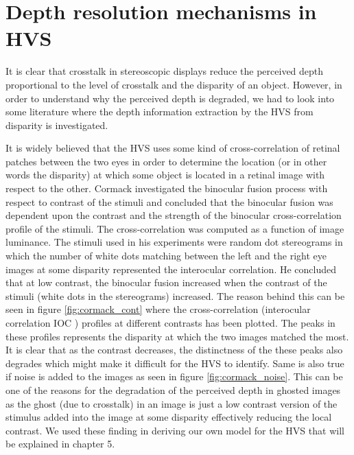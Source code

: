 \section{Depth resolution mechanisms in HVS}
It is clear that crosstalk in stereoscopic displays reduce the perceived depth proportional to the level of crosstalk and the disparity of an object. However, in order to understand why the perceived depth is degraded, we had to look into some literature where the depth information extraction by the HVS from disparity is investigated.

It is widely believed that the HVS uses some kind of cross-correlation of retinal patches between the two eyes in order to determine the location (or in other words the disparity) at which some object is located in a retinal image with respect to the other. Cormack \cite{cormack1991interocular} investigated the binocular fusion process with respect to contrast of the stimuli and concluded that the binocular fusion was dependent upon the contrast and the strength of the binocular cross-correlation profile of the stimuli. The cross-correlation was computed as a function of image luminance. The stimuli used in his experiments were random dot stereograms in which the number of white dots matching between the left and the right eye images at some disparity represented the interocular correlation. He concluded that at low contrast, the binocular fusion increased when the contrast of the stimuli (white dots in the stereograms) increased. The reason behind this can be seen in figure \ref{fig:cormack_cont} where the cross-correlation (interocular correlation IOC ) profiles at different contrasts has been plotted. The peaks in these profiles represents the disparity at which the two images matched the most. It is clear that as the contrast decreases, the distinctness of the these peaks also degrades which might make it difficult for the HVS to identify. Same is also true if noise is added to the images as seen in figure \ref{fig:cormack_noise}. This can be one of the reasons for the degradation of the perceived depth in ghosted images as the ghost (due to crosstalk) in an image is just a low contrast version of the stimulus added into the image at some disparity effectively reducing the local contrast. We used these finding in deriving our own model for the HVS that will be explained in chapter 5.

